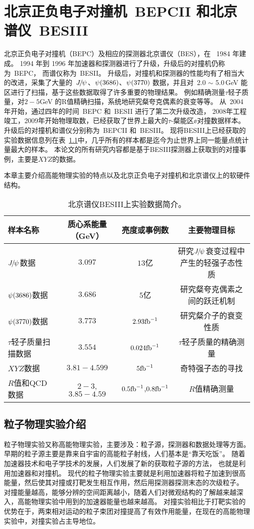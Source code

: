 \chapter{北京正负电子对撞机~BEPCII 和北京谱仪~BESIII}
\label{chap:bes3}
北京正负电子对撞机（BEPC）及相应的探测器北京谱仪（BES），在 ~1984 年建成。
1994 年到 1996 年加速器和探测器进行了升级，升级后的对撞机仍称为~BEPC，
而谱仪称为~BESII。
升级后，对撞机和探测器的性能均有了相当大的改进，采集了大量的~${{J\mskip -3mu/\mskip -2mu\psi\mskip 2mu}}$、${\psi(3686)}$、${\psi(3770)}$ 数据，并且对~2.0 $\sim$ 5.0\,GeV 能区进行了扫描，基于这些数据取得了许多重要的物理结果。
例如精确测量$\tau$轻子质量，对$2-5$GeV 的R值精确扫描，系统地研究粲夸克偶素的衰变等等。
从~2004 年开始，通过四年的时间~BEPC 和~BESII 进行了第二次升级改造，
2008年工程竣工，2009年开始物理取数，已经获取了世界上最大的$\tau$-粲能区$\ee$对撞数据样本。
升级后的对撞机和谱仪分别称为~BEPCII 和~BESIII\cite{BEPCBESIII_upgrade}。
现将BESIII上已经获取的实验数据信息列在表~\ref{tab:data}中，几乎所有的样本都是迄今为止世界上同一能量点统计量最大的样本。
本论文的所有研究内容都是基于BESIII探测器上获取到的对撞事例，主要是$XYZ$的数据。

本章主要介绍高能物理实验的特点以及北京正负电子对撞机和北京谱仪上的软硬件结构。

\begin{table}
\centering
\footnotesize
\caption{北京谱仪BESIII上实验数据简介。}
\begin{tabular}{lccc}
\toprule
样本名称 & 质心系能量（GeV） & 亮度或事例数 & 主要物理目标  \\
	\midrule
${{J\mskip -3mu/\mskip -2mu\psi\mskip 2mu}}$数据    & $3.097$ & $13$亿  & 研究${{J\mskip -3mu/\mskip -2mu\psi\mskip 2mu}}$衰变过程中产生的轻强子态性质  \\
${\psi(3686)}$数据    & $3.686$ & $5$亿  & 研究粲夸克偶素之间的跃迁机制  \\
${\psi(3770)}$数据    & $3.773$ & $2.93\rm{fb}^{-1}$  & 研究粲介子的衰变性质  \\
$\tau$轻子质量扫描数据    & $3.554$ & $0.024\rm{fb}^{-1}$  &  $\tau$轻子质量的精确测量  \\
$XYZ$数据    & $3.81-4.599$ & $5\rm{fb}^{-1}$  &  奇特强子态的寻找\\
$R$值和QCD数据    & $2-3$,$3.85-4.59$ & $0.5\rm{fb}^{-1}$,$0.8\rm{fb}^{-1}$  & $R$值精确测量 \\
\bottomrule
\end{tabular}
\label{tab:data}
\end{table}


\section{粒子物理实验介绍}
粒子物理实验又称高能物理实验，主要涉及：粒子源，探测器和数据处理等方面。
早期的粒子源主要是靠来自宇宙的高能粒子射线，人们基本是“靠天吃饭”。
随着加速器技术和电子学技术的发展，人们发展了新的获取粒子源的方法， 也就是利用加速器和对撞机。
现代的粒子物理实验主要就是利用加速器将粒子加速到很高能量，然后使其对撞或打靶发生相互作用，然后用探测器探测末态的次级粒子。
对撞能量越高，能够分辨的空间距离越小，随着人们对微观结构的了解越来越深入，高能物理实验中用到的加速器能量也越来越高。
对撞实验相比于打靶实验的优势在于，两束相对运动的粒子束团对撞提高了有效作用能量，在现在的高能物理实验中，对撞实验占主导地位。


